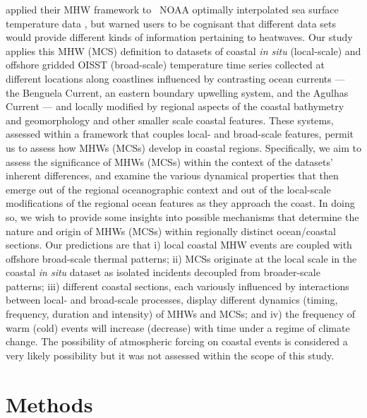 \documentclass[a4paper,10pt,review]{elsarticle}
\begin{document}
\citet{Hobday2016} applied their MHW framework to \degree~NOAA optimally interpolated sea surface temperature data \citep[hereafter referred to as OISST;][]{Reynolds2007}, but warned users to be cognisant that different data sets would provide different kinds of information pertaining to heatwaves. Our study applies this MHW (MCS) definition to datasets of coastal \emph{in situ} (local-scale) and offshore gridded OISST (broad-scale) temperature time series collected at different locations along coastlines influenced by contrasting ocean currents --- the Benguela Current, an eastern boundary upwelling system, and the Agulhas Current --- and locally modified by regional aspects of the coastal bathymetry and geomorphology and other smaller scale coastal features. These systems, assessed within a framework that couples local- and broad-scale features, permit us to assess how MHWs (MCSs) develop in coastal regions. Specifically, we aim to assess the significance of MHWs (MCSs) within the context of the datasets’ inherent differences, and examine the various dynamical properties that then emerge out of the regional oceanographic context and out of the local-scale modifications of the regional ocean features as they approach the coast. In doing so, we wish to provide some insights into possible mechanisms that determine the nature and origin of MHWs (MCSs) within regionally distinct ocean/coastal sections. Our predictions are that i) local coastal MHW events are coupled with offshore broad-scale thermal patterns; ii) MCSs originate at the local scale in the coastal \emph{in situ} dataset as isolated incidents decoupled from broader-scale patterns; iii) different coastal sections, each variously influenced by interactions between local- and broad-scale processes, display different dynamics (timing, frequency, duration and intensity) of MHWs and MCSs; and iv) the frequency of warm (cold) events will increase (decrease) with time under a regime of climate change. The possibility of atmospheric forcing on coastal events is considered a very likely possibility but it was not assessed within the scope of this study.

\section{Methods}
\end{document}
